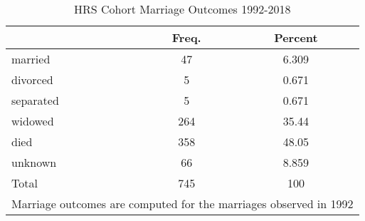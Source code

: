 \begin{table}[htbp]\centering
\def\sym#1{\ifmmode^{#1}\else\(^{#1}\)\fi}
\caption{HRS Cohort Marriage Outcomes 1992-2018}
\begin{tabular}{l*{1}{cc}}
\hline\hline
            &       Freq.&     Percent\\
\hline
married     &          47&       6.309\\
divorced    &           5&       0.671\\
separated   &           5&       0.671\\
widowed     &         264&       35.44\\
died        &         358&       48.05\\
unknown     &          66&       8.859\\
Total       &         745&         100\\
\hline\hline
\multicolumn{3}{l}{\footnotesize Marriage outcomes are computed for the marriages observed in 1992}\\
\end{tabular}
\end{table}
